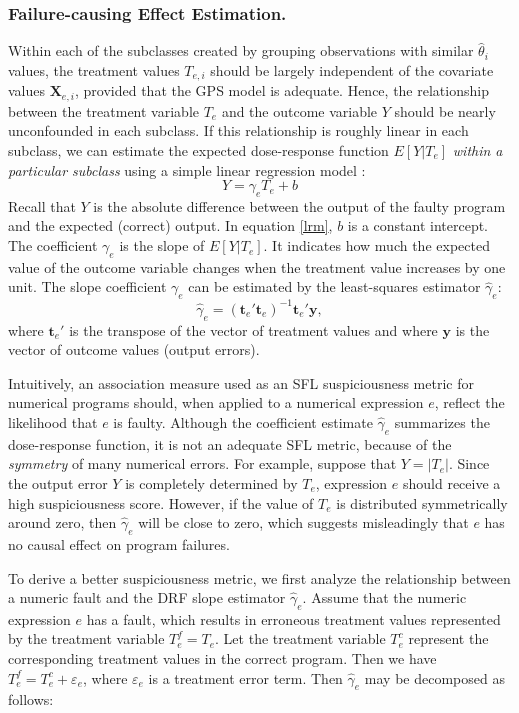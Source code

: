 \subsubsection{Failure-causing Effect Estimation.}
Within each of the subclasses created by grouping observations with similar $\hat \theta_i$ values, the treatment values $T_{e,i}$ should be largely independent of the covariate values $\pmb{X}_{e,i}$, provided that the GPS model is adequate. Hence, the relationship between the treatment variable $T_e$ and the outcome variable $Y$ should be nearly unconfounded in each subclass. If this relationship is roughly linear in each subclass, we can estimate the expected dose-response function $E[Y|T_e]$ {\it within a particular subclass} using a simple linear regression model \cite{Zhao2013}:
\begin{equation}\label{lrm}
Y=\gamma_eT_e+b
\end{equation}
Recall that $Y$ is the absolute difference between the output of the faulty program and the expected (correct) output. In equation \eqref{lrm}, $b$ is a constant intercept. The coefficient $\gamma_e$ is the slope of $E[Y|T_e]$. It indicates how much the expected value of the outcome variable changes when the treatment value increases by one unit. The slope coefficient $\gamma_e$ can be estimated by the least-squares estimator $\hat \gamma_e$:
\begin{equation}\label{ls}
\hat \gamma_e=({\pmb t}_e'{\pmb t}_e)^{-1}{\pmb t}_e'{\pmb y},
\end{equation}
where $\pmb{t}_e'$ is the transpose of the vector of treatment values and where $\pmb y$ is the vector of outcome values (output errors).

Intuitively, an association measure used as an SFL suspiciousness metric for numerical programs should, when applied to a numerical expression $e$, reflect the likelihood that $e$ is faulty.  Although the coefficient estimate $\hat \gamma_e$ summarizes the dose-response function, it is not an adequate SFL metric, because of the {\it symmetry} of many numerical errors. For example, suppose that $Y=|T_e |$.  Since the output error $Y$ is completely determined by $T_e$, expression $e$ should receive a high suspiciousness score. However, if the value of $T_e$ is distributed symmetrically around zero, then $\hat \gamma_e$ will be close to zero, which suggests misleadingly that $e$ has no causal effect on program failures.

To derive a better suspiciousness metric, we first analyze the relationship between a numeric fault and the DRF slope estimator $\hat \gamma_e$. Assume that the numeric expression $e$ has a fault, which results in erroneous treatment values represented by the treatment variable $T_e^f=T_e$.  Let the treatment variable $T_e^c$ represent the corresponding treatment values in the correct program. Then we have $T_e^f=T_e^c+\varepsilon_e$, where $\varepsilon_e$ is a treatment error term.  Then $\hat \gamma_e $ may be decomposed as follows:

